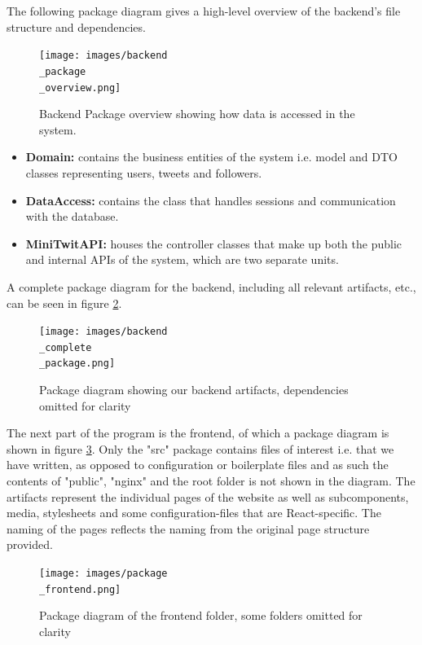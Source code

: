 The following package diagram gives a high-level overview of the backend's file structure and dependencies.
\begin{figure}[H]
 \centering
 \texttt{[image: images/backend\\\_package\\\_overview.png]}
 \caption{Backend Package overview showing how data is accessed in the system.}
 \label{fig:BackendPackageDiagram}
\end{figure}
\begin{itemize}
    \item \textbf{Domain:} contains the business entities of the system i.e. model and DTO classes representing users, tweets and followers.
    \item \textbf{DataAccess:} contains the class that handles sessions and communication with the database.
    \item \textbf{MiniTwitAPI:} houses the controller classes that make up both the public and internal APIs of the system, which are two separate units. 
\end{itemize}
A complete package diagram for the backend, including all relevant artifacts, etc., can be seen in figure \ref{fig:BackendCompletePackageDiagram}. \\

\begin{figure}[H]
 \centering
 \texttt{[image: images/backend\\\_complete\\\_package.png]}
 \caption{Package diagram showing our backend artifacts, dependencies omitted for clarity}
 \label{fig:BackendCompletePackageDiagram}
\end{figure}

\newpage
The next part of the program is the frontend, of which a package diagram is shown in figure \ref{fig:FrontendPackageDiagram}.
Only the "src" package contains files of interest i.e. that we have written, as opposed to configuration or boilerplate files and as such the contents of "public", "nginx" and the root folder is not shown in the diagram. The artifacts represent the individual pages of the website as well as subcomponents, media, stylesheets and some configuration-files that are React-specific. The naming of the pages reflects the naming from the original page structure provided.

\begin{figure}[H]
 \centering
 \texttt{[image: images/package\\\_frontend.png]}
 \caption{Package diagram of the frontend folder, some folders omitted for clarity}
 \label{fig:FrontendPackageDiagram}
\end{figure}


